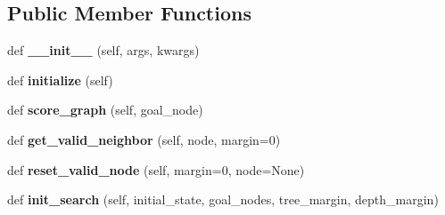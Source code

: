 \subsection*{Public Member Functions}
\begin{DoxyCompactItemize}
\item 
\mbox{\label{classrnb-planning_1_1src_1_1pkg_1_1planning_1_1task_1_1handle__a__star_1_1_handle_astar_a4a92d9219495218d01ac2dc3627e7e61}} 
def {\bfseries \+\_\+\+\_\+init\+\_\+\+\_\+} (self, args, kwargs)
\item 
\mbox{\label{classrnb-planning_1_1src_1_1pkg_1_1planning_1_1task_1_1handle__a__star_1_1_handle_astar_aeef8daa074aff609b82081d0d2db2282}} 
def {\bfseries initialize} (self)
\item 
\mbox{\label{classrnb-planning_1_1src_1_1pkg_1_1planning_1_1task_1_1handle__a__star_1_1_handle_astar_ae0d53b0fec284004ae743278747bcaeb}} 
def {\bfseries score\+\_\+graph} (self, goal\+\_\+node)
\item 
\mbox{\label{classrnb-planning_1_1src_1_1pkg_1_1planning_1_1task_1_1handle__a__star_1_1_handle_astar_a07c93c36dd05535af88abfeb32e388e7}} 
def {\bfseries get\+\_\+valid\+\_\+neighbor} (self, node, margin=0)
\item 
\mbox{\label{classrnb-planning_1_1src_1_1pkg_1_1planning_1_1task_1_1handle__a__star_1_1_handle_astar_adab11a3f383b7c2d6a0bdea243431aba}} 
def {\bfseries reset\+\_\+valid\+\_\+node} (self, margin=0, node=None)
\item 
\mbox{\label{classrnb-planning_1_1src_1_1pkg_1_1planning_1_1task_1_1handle__a__star_1_1_handle_astar_a385dd675c060eca72a26a9ac4c8a326a}} 
def {\bfseries init\+\_\+search} (self, initial\+\_\+state, goal\+\_\+nodes, tree\+\_\+margin, depth\+\_\+margin)
\item 

\end{DoxyCompactItemize}
